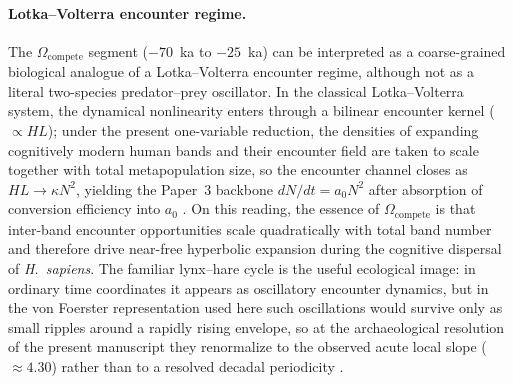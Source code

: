 \documentclass[11pt]{article}
\begin{document}
\paragraph{Lotka--Volterra encounter regime.}
The $\Omega_{\mathrm{compete}}$ segment ($-70$~ka to $-25$~ka) can be interpreted as a
coarse-grained biological analogue of a Lotka--Volterra encounter regime, although not as
a literal two-species predator--prey oscillator.
In the classical Lotka--Volterra system, the dynamical nonlinearity enters through a
bilinear encounter kernel ($\propto HL$); under the present one-variable reduction, the
densities of expanding cognitively modern human bands and their encounter field are taken
to scale together with total metapopulation size, so the encounter channel closes as
$HL\rightarrow \kappa N^{2}$, yielding the Paper~3 backbone $dN/dt=a_{0}N^{2}$ after
absorption of conversion efficiency into $a_{0}$ \cite{lotka1925,volterra1926}.
On this reading, the essence of $\Omega_{\mathrm{compete}}$ is that inter-band encounter
opportunities scale quadratically with total band number and therefore drive near-free
hyperbolic expansion during the cognitive dispersal of \textit{H.~sapiens}.
The familiar lynx--hare cycle is the useful ecological image: in ordinary time coordinates
it appears as oscillatory encounter dynamics, but in the von Foerster representation used
here such oscillations would survive only as small ripples around a rapidly rising envelope,
so at the archaeological resolution of the present manuscript they renormalize to the
observed acute local slope ($\approx 4.30$) rather than to a resolved decadal periodicity
\cite{eltonnicholson1942}.
\end{document}
